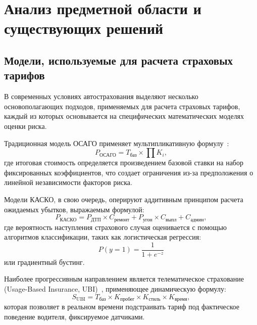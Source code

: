 \section{Анализ предметной области и существующих решений}

\subsection{Модели, используемые для расчета страховых тарифов}

В современных условиях автострахования выделяют несколько основополагающих подходов, применяемых для расчета страховых тарифов, каждый из которых основывается на специфических математических моделях оценки риска.

Традиционная модель ОСАГО применяет мультипликативную формулу~\cite{rgs2026kbm}:
\begin{equation*}
P_{\text{ОСАГО}} = T_{\text{баз}} \times \prod K_i,
\end{equation*}
где итоговая стоимость определяется произведением базовой ставки на набор фиксированных коэффициентов, что создает ограничения из-за предположения о линейной независимости факторов риска.

Модели КАСКО, в свою очередь, оперируют аддитивным принципом расчета ожидаемых убытков, выражаемым формулой:
\begin{equation*}
P_{\text{КАСКО}} = P_{\text{ДТП}} \times C_{\text{ремонт}} + P_{\text{угон}} \times C_{\text{выпл}} + C_{\text{админ}},
\end{equation*}
где вероятность наступления страхового случая оценивается с помощью алгоритмов классификации, таких как логистическая регрессия:
\begin{equation*}
P(y=1) = \frac{1}{1 + e^{-z}}
\end{equation*}
или градиентный бустинг.

Наиболее прогрессивным направлением является телематическое страхование (Usage-Based Insurance, UBI)~\cite{baulin2014telematics}, применяющее динамическую формулу:
\begin{equation*}
S_{\text{UBI}} = T_{\text{баз}} \times K_{\text{пробег}} \times K_{\text{стиль}} \times K_{\text{время}},
\end{equation*}
которая позволяет в реальном времени подстраивать тариф под фактическое поведение водителя, фиксируемое датчиками.

